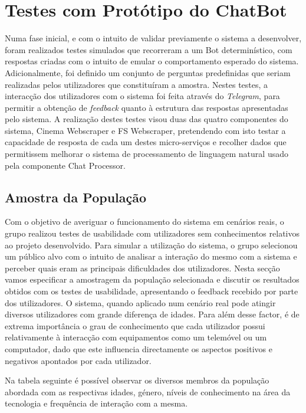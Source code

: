 \documentclass[11pt, a4paper]{article}
\begin{document}
\section{Testes com Protótipo do ChatBot}
Numa fase inicial, e com o intuito de validar previamente o sistema a desenvolver, foram realizados testes
simulados que recorreram a um Bot determinístico, com respostas criadas com o intuito de emular o
comportamento esperado do sistema. Adicionalmente, foi definido um conjunto de perguntas predefinidas que
seriam realizadas pelos utilizadores que constituíram a amostra. Nestes testes, a interacção dos
utilizadores com o sistema foi feita através do \textit{Telegram}, para permitir a obtenção de
\textit{feedback} quanto à estrutura das respostas apresentadas pelo sistema.  A realização destes testes
visou duas das quatro componentes do sistema, Cinema Webscraper e FS Webscraper, pretendendo com isto testar
a capacidade de resposta de cada um destes micro-serviços e recolher dados que permitissem melhorar o sistema
de processamento de linguagem natural usado pela componente Chat Processor.

\subsection{Amostra da População}
Com o objetivo de averiguar o funcionamento do sistema em cenários reais, o grupo realizou testes de usabilidade com utilizadores sem conhecimentos relativos ao projeto desenvolvido. 
Para simular a utilização do sistema, o grupo selecionou um público alvo com o intuito de analisar a interação do mesmo com a sistema e perceber quais eram as principais dificuldades dos utilizadores. 
Nesta secção vamos especificar a amostragem da população selecionada e discutir os resultados obtidos com os testes de usabilidade, apresentando o feedback recebido por parte dos utilizadores.
O sistema, quando aplicado num cenário real pode atingir diversos utilizadores com grande diferença de idades. Para além desse factor, é de extrema 
importância o grau de conhecimento que cada utilizador possui relativamente à interacção com equipamentos como um telemóvel ou um computador, dado que
este influencia directamente os aspectos positivos e negativos apontados por cada utilizador.

Na tabela seguinte é possível observar os diversos membros da população abordada com as respectivas idades, género, níveis de conhecimento na área da tecnologia e frequência de interação com a mesma.
\end{document}
